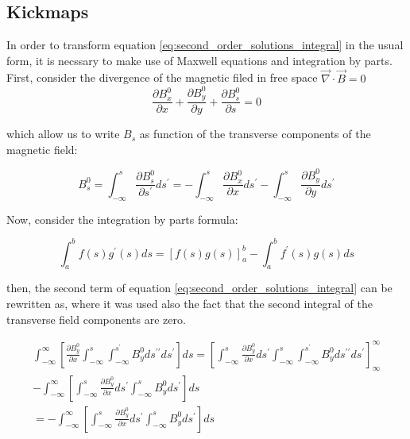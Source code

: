 \documentclass[a4paper,12pt]{article}
\begin{document}
\subsection{Kickmaps}
\par In order to transform equation \eqref{eq:second_order_solutions_integral} in the usual form, it is necssary to make 
use of Maxwell equations and integration by parts.
First, consider the divergence of the magnetic filed in free space $\vec{\nabla} \cdot \vec{B} = 0$
\begin{equation}
    \frac{\partial B_{x}^{0}}{\partial x} + \frac{\partial B_{y}^{0}}{\partial y} + \frac{\partial B_{s}^{0}}{\partial s} = 0
    \label{eq:divergence_free}
\end{equation}

which allow us to write $B_s$ as function of the transverse components of the magnetic field:

\begin{equation}
    B_s^{0} = \int_{-\infty}^{s}\frac{\partial B_s^{0}}{\partial s^{\prime}}ds^{\prime} =
     -\int_{-\infty}^{s}\frac{\partial B_x^{0}}{\partial x}ds^{\prime} - \int_{-\infty}^{s}\frac{\partial B_y^{0}}{\partial y}ds^{\prime}
     \label{eq:Bs_integral}
\end{equation}

Now, consider the integration by parts formula:

\begin{equation}
    \int_{a}^{b}f(s)g^{\prime}(s)ds = \left[f(s)g(s)\right]_{a}^{b} - \int_{a}^{b}f^{\prime}(s)g(s)ds
    \label{eq:int_parts}
\end{equation}

then, the second term of equation \eqref{eq:second_order_solutions_integral} can be rewritten as, where it was used
also the fact that the second integral of the transverse field components are zero.

\begin{equation}
    \begin{aligned}
    \int_{-\infty}^{\infty}\left[\frac{\partial B_{y}^{0}}{\partial x}\int_{-\infty}^{s}\int_{-\infty}^{s^{\prime}}B_{y}^{0}ds^{\prime \prime}ds^
    {\prime}\right]ds = \left[\int_{-\infty}^{s}\frac{\partial B_y^{0}}{\partial x} ds^{\prime}\int_{-\infty}^{s}\int_{-\infty}^{s^\prime}
    B_{y}^{0}ds^{\prime \prime}ds^{\prime}\right]_{\infty}^{\infty} \\ 
    - \int_{-\infty}^{\infty}\left[\int_{-\infty}^{s}\frac{\partial B_y^{0}}{\partial x}ds^{\prime}\int_{-\infty}^{s}
    B_{y}^{0}ds^{\prime}\right]ds \\
    = - \int_{-\infty}^{\infty}\left[\int_{-\infty}^{s}\frac{\partial B_y^{0}}{\partial x}ds^{\prime}\int_{-\infty}^{s}
    B_{y}^{0}ds^{\prime}\right]ds
    \end{aligned}
    \label{eq:second_term}
\end{equation}
\end{document}
